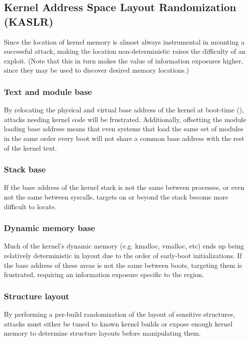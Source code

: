 \documentclass[a4paper,8pt,english]{sphinxmanual}
\begin{document}
\subsection{Kernel Address Space Layout Randomization (KASLR)}
\label{security/self-protection:kernel-address-space-layout-randomization-kaslr}
Since the location of kernel memory is almost always instrumental in
mounting a successful attack, making the location non-deterministic
raises the difficulty of an exploit. (Note that this in turn makes
the value of information exposures higher, since they may be used to
discover desired memory locations.)


\subsubsection{Text and module base}
\label{security/self-protection:text-and-module-base}
By relocating the physical and virtual base address of the kernel at
boot-time (), attacks needing kernel code will be
frustrated. Additionally, offsetting the module loading base address
means that even systems that load the same set of modules in the same
order every boot will not share a common base address with the rest of
the kernel text.


\subsubsection{Stack base}
\label{security/self-protection:stack-base}
If the base address of the kernel stack is not the same between processes,
or even not the same between syscalls, targets on or beyond the stack
become more difficult to locate.


\subsubsection{Dynamic memory base}
\label{security/self-protection:dynamic-memory-base}
Much of the kernel's dynamic memory (e.g. kmalloc, vmalloc, etc) ends up
being relatively deterministic in layout due to the order of early-boot
initializations. If the base address of these areas is not the same
between boots, targeting them is frustrated, requiring an information
exposure specific to the region.


\subsubsection{Structure layout}
\label{security/self-protection:structure-layout}
By performing a per-build randomization of the layout of sensitive
structures, attacks must either be tuned to known kernel builds or expose
enough kernel memory to determine structure layouts before manipulating
them.
\end{document}

